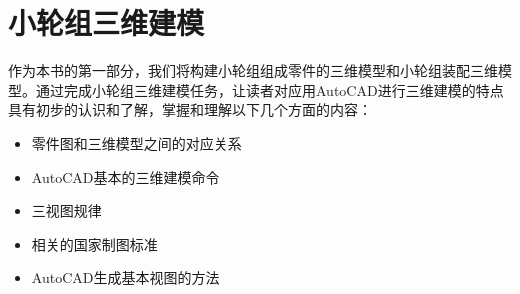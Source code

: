 \documentclass[12pt,a4paper,twoside,openany]{book}
\begin{document}

\title{}
\author{}
\date{\today}
\maketitle
\frontmatter

\tableofcontents
\mainmatter
\graphicspath{{pdf/}{png/}}
\part{小轮组三维建模}
作为本书的第一部分，我们将构建小轮组组成零件的三维模型和小轮组装配三维模型。通过完成小轮组三维建模任务，让读者对应用AutoCAD进行三维建模的特点具有初步的认识和了解，掌握和理解以下几个方面的内容：
\begin{itemize}
\item 零件图和三维模型之间的对应关系
\item AutoCAD基本的三维建模命令
\item 三视图规律
\item 相关的国家制图标准
\item AutoCAD生成基本视图的方法
\end{itemize} 































\end{document}

